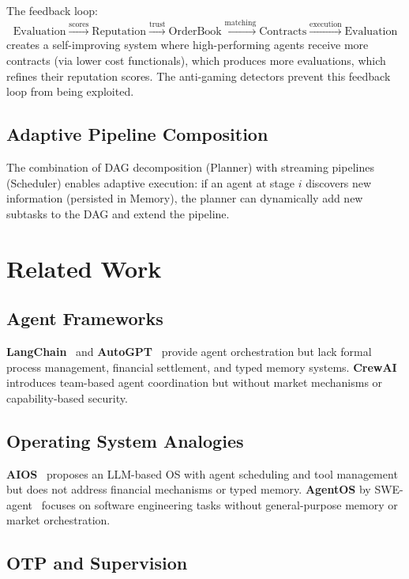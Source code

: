 \documentclass[12pt,a4paper]{article}
\theoremstyle{definition}
\begin{document}
The feedback loop:
\[
  \text{Evaluation} \xrightarrow{\text{scores}} \text{Reputation}
  \xrightarrow{\text{trust}} \text{OrderBook}
  \xrightarrow{\text{matching}} \text{Contracts}
  \xrightarrow{\text{execution}} \text{Evaluation}
\]
creates a self-improving system where high-performing agents receive more
contracts (via lower cost functionals), which produces more evaluations,
which refines their reputation scores. The anti-gaming detectors prevent
this feedback loop from being exploited.

\subsection{Adaptive Pipeline Composition}

The combination of DAG decomposition (Planner) with streaming pipelines
(Scheduler) enables adaptive execution: if an agent at stage $i$ discovers
new information (persisted in Memory), the planner can dynamically add new
subtasks to the DAG and extend the pipeline.


\section{Related Work}\label{sec:related}

\subsection{Agent Frameworks}

\textbf{LangChain}~\citep{langchain2023} and \textbf{AutoGPT}~\citep{autogpt2023}
provide agent orchestration but lack formal process management, financial
settlement, and typed memory systems. \textbf{CrewAI}~\citep{crewai2024}
introduces team-based agent coordination but without market mechanisms
or capability-based security.

\subsection{Operating System Analogies}

\textbf{AIOS}~\citep{mei2024aios} proposes an LLM-based OS with agent scheduling
and tool management but does not address financial mechanisms or typed memory.
\textbf{AgentOS} by SWE-agent~\citep{yang2024swe} focuses on software engineering
tasks without general-purpose memory or market orchestration.

\subsection{OTP and Supervision}
\end{document}
